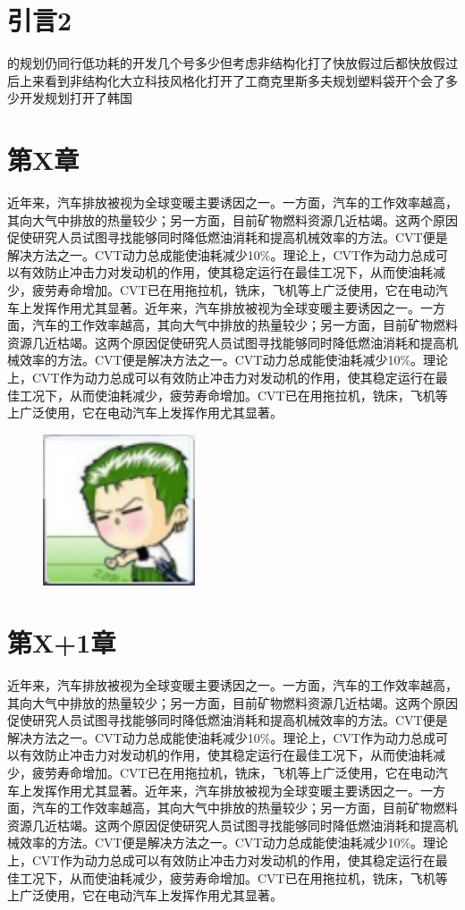 \documentclass[a4paper,12pt]{article}
\newcommand{\wuhao}{\fontsize{10.5pt}{20pt}\selectfont}%
\begin{document}
\begin{multicols}{2}
\section{引言2}
\song\wuhao 的规划仍同行低功耗的开发几个号多少但考虑非结构化打了快放假过后都快放假过后上来看到非结构化大立科技风格化打开了工商克里斯多夫规划塑料袋开个会了多少开发规划打开了韩国
%
\section{第X章}
\song\wuhao 近年来，汽车排放被视为全球变暖主要诱因之一。一方面，汽车的工作效率越高，其向大气中排放的热量较少；另一方面，目前矿物燃料资源几近枯竭。这两个原因促使研究人员试图寻找能够同时降低燃油消耗和提高机械效率的方法。CVT便是解决方法之一。CVT动力总成能使油耗减少10\%。理论上，CVT作为动力总成可以有效防止冲击力对发动机的作用，使其稳定运行在最佳工况下，从而使油耗减少，疲劳寿命增加。CVT已在用拖拉机，铣床，飞机等上广泛使用，它在电动汽车上发挥作用尤其显著。近年来，汽车排放被视为全球变暖主要诱因之一。一方面，汽车的工作效率越高，其向大气中排放的热量较少；另一方面，目前矿物燃料资源几近枯竭。这两个原因促使研究人员试图寻找能够同时降低燃油消耗和提高机械效率的方法。CVT便是解决方法之一。CVT动力总成能使油耗减少10\%。理论上，CVT作为动力总成可以有效防止冲击力对发动机的作用，使其稳定运行在最佳工况下，从而使油耗减少，疲劳寿命增加。CVT已在用拖拉机，铣床，飞机等上广泛使用，它在电动汽车上发挥作用尤其显著。
\begin{figure}[H]
  \includegraphics[width=0.4\textwidth]{tupianceshi.jpg}
\end{figure}
\end{multicols}
\section{第X+1章}
\vspace*{-10pt}
\song\wuhao 近年来，汽车排放被视为全球变暖主要诱因之一。一方面，汽车的工作效率越高，其向大气中排放的热量较少；另一方面，目前矿物燃料资源几近枯竭。这两个原因促使研究人员试图寻找能够同时降低燃油消耗和提高机械效率的方法。CVT便是解决方法之一。CVT动力总成能使油耗减少10\%。理论上，CVT作为动力总成可以有效防止冲击力对发动机的作用，使其稳定运行在最佳工况下，从而使油耗减少，疲劳寿命增加。CVT已在用拖拉机，铣床，飞机等上广泛使用，它在电动汽车上发挥作用尤其显著。近年来，汽车排放被视为全球变暖主要诱因之一。一方面，汽车的工作效率越高，其向大气中排放的热量较少；另一方面，目前矿物燃料资源几近枯竭。这两个原因促使研究人员试图寻找能够同时降低燃油消耗和提高机械效率的方法。CVT便是解决方法之一。CVT动力总成能使油耗减少10\%。理论上，CVT作为动力总成可以有效防止冲击力对发动机的作用，使其稳定运行在最佳工况下，从而使油耗减少，疲劳寿命增加。CVT已在用拖拉机，铣床，飞机等上广泛使用，它在电动汽车上发挥作用尤其显著。
\end{document}
